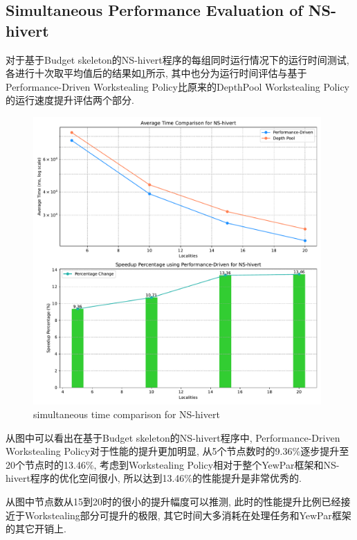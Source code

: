 \documentclass{mproj}
\begin{document}
\subsection{Simultaneous Performance Evaluation of NS-hivert}

对于基于Budget skeleton的NS-hivert程序的每组同时运行情况下的运行时间测试,各进行十次取平均值后的结果如\cref{fig:time_comparison_ns_simu}所示,
其中也分为运行时间评估与基于Performance-Driven Workstealing Policy比原来的DepthPool Workstealing Policy的运行速度提升评估两个部分.

\begin{figure}[h]
    \centering %
    \includegraphics[width=0.98\textwidth]{images/time_comparison_ns_simultaneously.pdf} %
    \caption{simultaneous time comparison for NS-hivert} %
    \label{fig:time_comparison_ns_simu} %
\end{figure}
\FloatBarrier

从图中可以看出在基于Budget skeleton的NS-hivert程序中,
Performance-Driven Workstealing Policy对于性能的提升更加明显,
从5个节点数时的9.36\%逐步提升至20个节点时的13.46\%,
考虑到Workstealing Policy相对于整个YewPar框架和NS-hivert程序的优化空间很小,
所以达到13.46\%的性能提升是非常优秀的.

从图中节点数从15到20时的很小的提升幅度可以推测,
此时的性能提升比例已经接近于Workstealing部分可提升的极限,
其它时间大多消耗在处理任务和YewPar框架的其它开销上.
\end{document}
